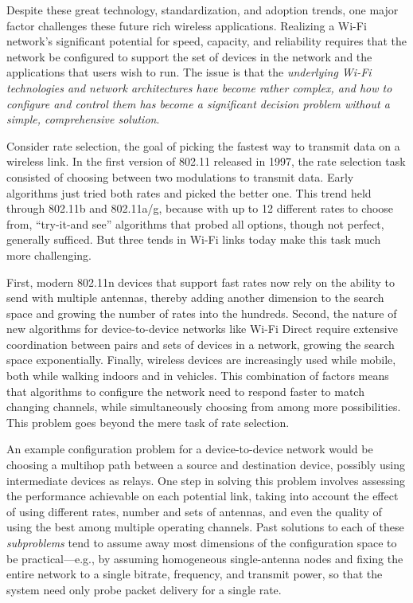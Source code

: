 
Despite these great technology, standardization, and adoption trends, one major factor challenges these future rich wireless applications.
Realizing a Wi-Fi network's significant potential for speed, capacity, and reliability requires that the network be configured to support the set of devices in the network and the applications that users wish to run. The issue is that the \emph{underlying Wi-Fi technologies and network architectures have become rather complex, and how to configure and control them has become a significant decision problem without a simple, comprehensive solution}.

Consider rate selection, the goal of picking the fastest way to transmit data on a wireless link. In the first version of 802.11 released in 1997, the rate selection task consisted of choosing between two modulations to transmit data. Early algorithms just tried both rates and picked the better one. This trend held through 802.11b and 802.11a/g, because with up to 12 different rates to choose from, ``try-it-and see'' algorithms that probed all options, though not perfect, generally sufficed. But three tends in Wi-Fi links today make this task much more challenging.

First, modern 802.11n devices that support fast rates now rely on the ability to send with multiple antennas, thereby adding another dimension to the search space and growing the number of rates into the hundreds. Second, the nature of new algorithms for device-to-device networks like Wi-Fi Direct require extensive coordination between pairs and sets of devices in a network, growing the search space exponentially. Finally, wireless devices are increasingly used while mobile, both while walking indoors and in vehicles. This combination of factors means that algorithms to configure the network need to respond faster to match changing channels, while simultaneously choosing from among more possibilities. This problem goes beyond the mere task of rate selection.

An example configuration problem for a device-to-device network would be choosing a multihop path between a source and destination device, possibly using intermediate devices as relays. One step in solving this problem involves assessing the performance achievable on each potential link, taking into account the effect of using different rates, number and sets of antennas, and even the quality of using the best among multiple operating channels. Past solutions to each of these \emph{subproblems} tend to assume away most dimensions of the configuration space to be practical---e.g., by assuming homogeneous single-antenna nodes and fixing the entire network to a single bitrate, frequency, and transmit power, so that the system need only probe packet delivery for a single rate.

